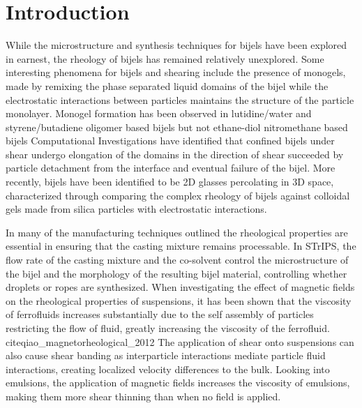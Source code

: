
\section{Introduction}

While the microstructure and synthesis techniques for bijels have been explored in earnest, the rheology of bijels
has remained relatively unexplored. Some interesting phenomena for bijels and shearing include the 
presence of monogels, made by remixing the phase separated liquid domains of the bijel while the electrostatic
interactions between particles maintains the structure of the particle monolayer. \cite{sanz_colloidal_2009} 
Monogel formation has been observed in lutidine/water and styrene/butadiene oligomer based bijels but not ethane-diol nitromethane based bijels
\cite{sanz_colloidal_2009, bai_dynamics_2015, tavacoli_novel_2011} Computational Investigations have identified that confined bijels under shear undergo elongation of
the domains in the direction of shear succeeded by particle detachment from the interface and eventual failure of the bijel. \cite{bonaccorso_shear_2020}
More recently, bijels have been identified to be 2D glasses percolating in 3D space, characterized through comparing the complex rheology of bijels against
colloidal gels made from silica particles with electrostatic interactions. \cite{ching_bijel_2022} 

In many of the manufacturing techniques outlined the rheological properties are essential in ensuring that 
the casting mixture remains processable. \cite{haase_continuous_2015,haase_situ_2016} In STrIPS, the flow rate of the casting mixture and the co-solvent
control the microstructure of the bijel and the morphology of the resulting bijel material, controlling whether droplets or ropes are synthesized. \cite{haase_continuous_2015}
When investigating the effect of magnetic fields on the rheological properties of suspensions, it has been shown that the viscosity of ferrofluids increases substantially due
to the self assembly of particles restricting the flow of fluid, greatly increasing the viscosity of the ferrofluid. cite{qiao_magnetorheological_2012} The application
of shear onto suspensions can also cause shear banding as interparticle interactions mediate particle fluid interactions, creating localized velocity differences to the bulk.
\cite{xu_relation_2013} Looking into emulsions, the application of magnetic fields increases the viscosity of emulsions, making them more shear thinning than when no field 
is applied.

